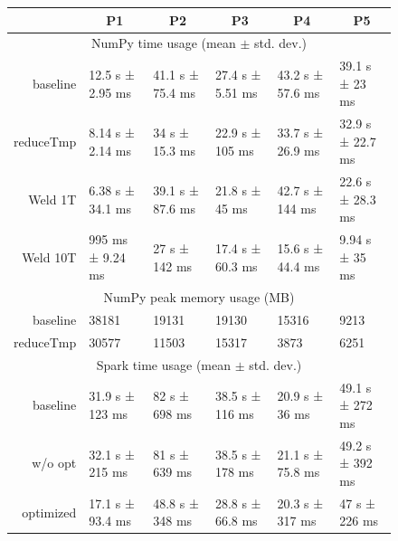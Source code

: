 \documentclass[sigconf]{acmart}\settopmatter{printfolios=true,printccs=false,printacmref=false}\setcopyright{none}
\begin{document}
\begin{figure}[ht]
\begin{minipage}[b]{0.7\linewidth}
  \centering
  \small
  \begin{tabular}{r|l|l|l|l|l}
  \hline
  & \multicolumn{1}{c|}{P1} & \multicolumn{1}{c|}{P2}  & \multicolumn{1}{c|}{P3}  & \multicolumn{1}{c|}{P4}  & \multicolumn{1}{c}{P5}  \\
  \hline
  \multicolumn{6}{c}{NumPy time usage (mean $\pm$ std. dev.)} \\
  \hline
  baseline & 12.5 s ± 2.95 ms 
           & 41.1 s ± 75.4 ms
           & 27.4 s ± 5.51 ms
           & 43.2 s ± 57.6 ms
           & 39.1 s ± 23 ms\\
  
  
  reduceTmp & 8.14 s ± 2.14 ms 
            & 34 s ± 15.3 ms
            & 22.9 s ± 105 ms
            & 33.7 s ± 26.9 ms
            & 32.9 s ± 22.7 ms\\
            
  Weld 1T & 6.38 s ± 34.1 ms 
          & 39.1 s ± 87.6 ms
          & 21.8 s ± 45 ms
          & 42.7 s ± 144 ms
          & 22.6 s ± 28.3 ms\\
          
  Weld 10T & 995 ms ± 9.24 ms 
           & 27 s ± 142 ms
           & 17.4 s ± 60.3 ms
           & 15.6 s ± 44.4 ms
           & 9.94 s ± 35 ms\\
  \hline
  \multicolumn{6}{c}{NumPy peak memory usage (MB)} \\
  \hline
  baseline & 38181 
           & 19131
           & 19130
           & 15316
           & 9213\\
  
  reduceTmp & 30577 
            & 11503
            & 15317
            & 3873
            & 6251\\
  \hline
  \multicolumn{6}{c}{Spark time usage (mean $\pm$ std. dev.)} \\
  \hline
  baseline & 31.9 s ± 123 ms 
           & 82 s ± 698 ms
           & 38.5 s ± 116 ms
           & 20.9 s ± 36 ms
           & 49.1 s ± 272 ms \\
           
  w/o opt & 32.1 s ± 215 ms 
          & 81 s ± 639 ms
          & 38.5 s ± 178 ms
          & 21.1 s ± 75.8 ms
          & 49.2 s ± 392 ms\\
  optimized & 17.1 s ± 93.4 ms
            & 48.8 s ± 348 ms
            & 28.8 s ± 66.8 ms
            & 20.3 s ± 317 ms
            & 47 s ± 226 ms\\
  

\end{tabular}
\end{minipage}
\end{figure}
\end{document}
